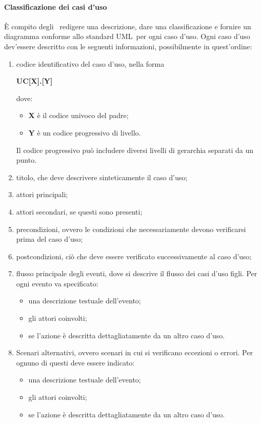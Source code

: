 \documentclass[../NormeProgetto.text]{subfiles}
\begin{document}
				\paragraph{Classificazione dei casi d'uso}
					È compito degli \analisti\ redigere una descrizione, dare una classificazione e fornire un diagramma conforme allo standard UML\g\ per ogni caso d'uso. Ogni caso d'uso dev'essere descritto con le seguenti informazioni, possibilmente in quest'ordine:
					\begin{enumerate}
						\item codice identificativo del caso d'uso, nella forma \begin{center}\textbf{UC[X].[Y]}\end{center} dove:
						\begin{itemize}
							\item \textbf{X} è il codice univoco del padre;
							\item \textbf{Y} è un codice progressivo di livello.
						\end{itemize}
						Il codice progressivo può includere diversi livelli di gerarchia separati da un punto.
						\item titolo, che deve descrivere sinteticamente il caso d'uso;
						\item attori principali;
						\item attori secondari, se questi sono presenti;
						\item precondizioni, ovvero le condizioni che necessariamente devono verificarsi prima del caso d'uso;
						\item postcondizioni, ciò che deve essere verificato successivamente al caso d'uso;
						\item flusso principale degli eventi, dove si descrive il flusso dei casi d'uso figli. Per ogni evento va specificato:
						\begin{itemize}
							\item una descrizione testuale dell'evento;
							\item gli attori coinvolti;
							\item se l'azione è descritta dettagliatamente da un altro caso d'uso.
						\end{itemize}
						\item Scenari alternativi, ovvero scenari in cui si verificano eccezioni o errori. Per ognuno di questi deve essere indicato:
							\begin{itemize}
								\item una descrizione testuale dell'evento;
								\item gli attori coinvolti;
								\item se l'azione è descritta dettagliatamente da un altro caso d'uso.
							\end{itemize}
					\end{enumerate}
\end{document}
